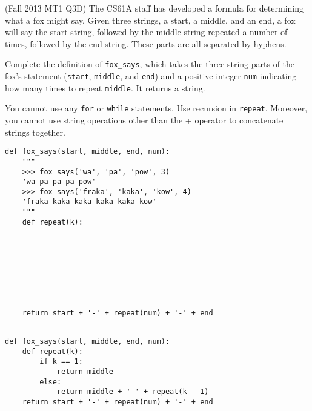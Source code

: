 \begin{blocksection}
\question (Fall 2013 MT1 Q3D) The CS61A staff has developed a formula for determining what a fox might say.
Given three strings, a start, a middle, and an end, a fox will say the start string, followed by the 
middle string repeated a number of times, followed by the end string. These parts are all separated by hyphens.

Complete the definition of \lstinline$fox_says$, which takes the three string parts of the fox's statement
(\lstinline$start$, \lstinline$middle$, and \lstinline$end$) and a positive integer \lstinline$num$ indicating
how many times to repeat \lstinline$middle$. It returns a string.

You cannot use any \lstinline$for$ or \lstinline$while$ statements. Use recursion in \lstinline$repeat$. Moreover,
you cannot use string operations other than the + operator to concatenate strings together.


\begin{lstlisting}
def fox_says(start, middle, end, num):
    """    
    >>> fox_says('wa', 'pa', 'pow', 3)
    'wa-pa-pa-pa-pow'
    >>> fox_says('fraka', 'kaka', 'kow', 4)
    'fraka-kaka-kaka-kaka-kaka-kow'
    """
    def repeat(k):
        
        
        
        
        
        
        
        
    return start + '-' + repeat(num) + '-' + end
    
\end{lstlisting}

\begin{solution}[1.5in]
\begin{lstlisting}
def fox_says(start, middle, end, num):
    def repeat(k):
        if k == 1:
            return middle
        else:
            return middle + '-' + repeat(k - 1)
    return start + '-' + repeat(num) + '-' + end
\end{lstlisting}
\end{solution}
\end{blocksection}
